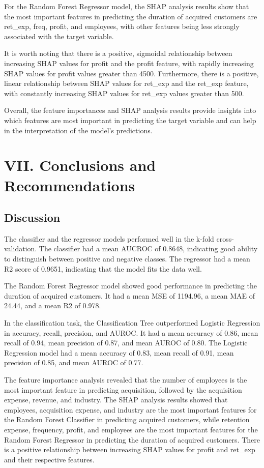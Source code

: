 For the Random Forest Regressor model, the SHAP analysis results show
that the most important features in predicting the duration of acquired
customers are ret\_exp, freq, profit, and employees, with other features
being less strongly associated with the target variable.

It is worth noting that there is a positive, sigmoidal relationship
between increasing SHAP values for profit and the profit feature, with
rapidly increasing SHAP values for profit values greater than 4500.
Furthermore, there is a positive, linear relationship between SHAP
values for ret\_exp and the ret\_exp feature, with constantly increasing
SHAP values for ret\_exp values greater than 500.

Overall, the feature importances and SHAP analysis results provide
insights into which features are most important in predicting the target
variable and can help in the interpretation of the model's predictions.

\hypertarget{vii-conclusions-and-recommendations}{%
\section{VII. Conclusions and
Recommendations}\label{vii-conclusions-and-recommendations}}

\hypertarget{discussion}{%
\subsection{Discussion}\label{discussion}}

The classifier and the regressor models performed well in the k-fold
cross-validation. The classifier had a mean AUCROC of 0.8648, indicating
good ability to distinguish between positive and negative classes. The
regressor had a mean R2 score of 0.9651, indicating that the model fits
the data well.

The Random Forest Regressor model showed good performance in predicting
the duration of acquired customers. It had a mean MSE of 1194.96, a mean
MAE of 24.44, and a mean R2 of 0.978.

In the classification task, the Classification Tree outperformed
Logistic Regression in accuracy, recall, precision, and AUROC. It had a
mean accuracy of 0.86, mean recall of 0.94, mean precision of 0.87, and
mean AUROC of 0.80. The Logistic Regression model had a mean accuracy of
0.83, mean recall of 0.91, mean precision of 0.85, and mean AUROC of
0.77.

The feature importance analysis revealed that the number of employees is
the most important feature in predicting acquisition, followed by the
acquisition expense, revenue, and industry. The SHAP analysis results
showed that employees, acquisition expense, and industry are the most
important features for the Random Forest Classifier in predicting
acquired customers, while retention expense, frequency, profit, and
employees are the most important features for the Random Forest
Regressor in predicting the duration of acquired customers. There is a
positive relationship between increasing SHAP values for profit and
ret\_exp and their respective features.

